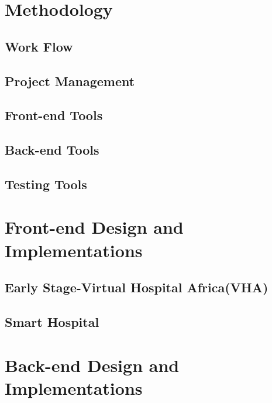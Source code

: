 %
%
\chapter{Methodology}
\label{chap:D&I}

\section{Work Flow}
\label{subsec:subsec01}

\section{Project Management}
\label{subsec:PM}


\section{Front-end Tools}
\label{subsec:FETools}


\section{Back-end Tools}
\label{subsec:BETools}


\section{Testing Tools}
\label{subsec:subsec05}

\chapter{Front-end Design and Implementations}
\label{sec:sec02}

\section{Early Stage-Virtual Hospital Africa(VHA)}
\label{subsec:subsec01}


\section{Smart Hospital}
\label{subsec:subsec02}


\chapter{Back-end Design and Implementations}
\label{sec:sec03}


